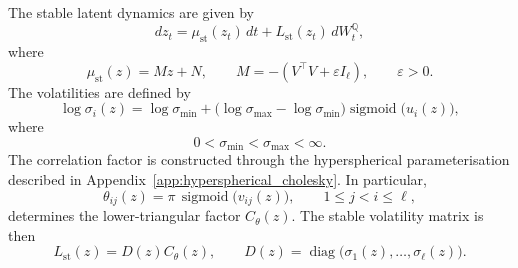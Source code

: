 The stable latent dynamics are given by
\begin{equation}
    dz_t
    =
    \mu_{\mathrm{st}}(z_t)\,dt
    +
    L_{\mathrm{st}}(z_t)\,dW_t^{\mathbb Q},
    \label{eq:app_stable_sde}
\end{equation}
where
\[
    \mu_{\mathrm{st}}(z)
    =
    Mz+N,
    \qquad
    M=-(V^\top V+\varepsilon I_\ell),
    \qquad
    \varepsilon>0.
\]
The volatilities are defined by
\[
    \log \sigma_i(z)
    =
    \log \sigma_{\min}
    +
    \bigl(
        \log \sigma_{\max}
        -
        \log \sigma_{\min}
    \bigr)
    \operatorname{sigmoid}\bigl(u_i(z)\bigr),
\]
where
\[
    0<\sigma_{\min}<\sigma_{\max}<\infty.
\]
The correlation factor is constructed through the hyperspherical parameterisation described in  Appendix~\ref{app:hyperspherical_cholesky}. In particular,
\[
    \theta_{ij}(z)
    =
    \pi\,\operatorname{sigmoid}\bigl(v_{ij}(z)\bigr),
    \qquad
    1\leq j<i\leq\ell,
\]
determines the lower-triangular factor \(C_\theta(z)\). The stable volatility matrix is then
\[
    L_{\mathrm{st}}(z)
    =
    D(z)C_\theta(z),
    \qquad
    D(z)
    =
    \operatorname{diag}
    \bigl(\sigma_1(z),\ldots,\sigma_\ell(z)\bigr).
\]


